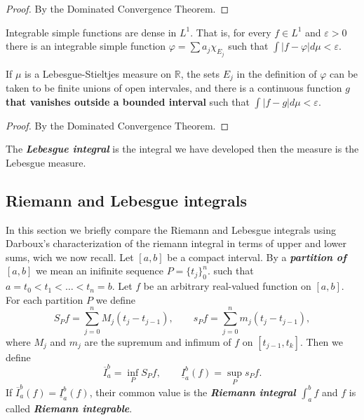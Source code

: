 \documentclass{article}
\theoremstyle{definition}
\numberwithin{equation}{section}
\newcommand{\R}{\mathbb{R}}
\begin{document}
	\begin{proof}
		By the Dominated Convergence Theorem.
	\end{proof}
	\begin{thm}
		Integrable simple functions are dense in $L^1$. That is, for every $f\in L^1$ and $\varepsilon>0$ there is an integrable simple function $\varphi=\sum a_j\chi_{E_j}$ such that $\int|f-\varphi|d\mu<\varepsilon$.
		
		If $\mu$ is a Lebesgue-Stieltjes measure on $\R$, the sets $E_j$ in the definition of $\varphi$ can be taken to be finite unions of open intervales, and there is a continuous function $g$ \textbf{that vanishes outside a bounded interval} such that $\int|f-g|d\mu<\varepsilon$.
	\end{thm}
	\begin{proof}
		By the Dominated Convergence Theorem.
	\end{proof}
	
	
	The \textbf{\textit{Lebesgue integral}} is the integral we have developed then the measure is the Lebesgue measure.
	
	\subsection{Riemann and Lebesgue integrals}
	In this section we briefly compare the Riemann and Lebesgue integrals using Darboux's characterization of the riemann integral in terms of upper and lower sums, wich we now recall. Let $[a,b]$ be a compact interval. By a \textbf{\textit{partition of $[a,b]$}} we mean an inifinite sequence $P=\{t_j\}_{0}^{n}$. such that $a=t_0<t_1<\ldots<t_n=b$. Let $f$ be an arbitrary real-valued function on $[a,b]$. For each partition $P$ we define
	\[S_Pf=\sum_{j=0}^nM_j(t_j-t_{j-1}),\qquad s_Pf=\sum_{j=0}^nm_j(t_j-t_{j-1}),\]
	where $M_j$ and $m_j$ are the supremum and infimum of $f$ on $[t_{j-1},t_k]$. Then we define
	\[\overline{I}_a^b=\inf_PS_Pf,\qquad\underline{I}^b_a(f)=\sup_Ps_Pf.\]
	If $\overline{I}^b_a(f)=\underline{I}_a^b(f)$, their common value is the \textbf{\textit{Riemann integral $\int_a^bf$}} and $f$ is called \textbf{\textit{Riemann integrable}}.
	
\end{document}
